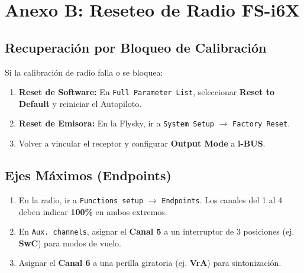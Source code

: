 \documentclass[12pt,a4paper]{article}
\begin{document}
\vspace{1cm}
\section{Anexo B: Reseteo de Radio FS-i6X}
\subsection{Recuperación por Bloqueo de Calibración}
Si la calibración de radio falla o se bloquea:
\begin{enumerate}[leftmargin=*,noitemsep]
    \item \textbf{Reset de Software:} En \texttt{Full Parameter List}, seleccionar \textbf{Reset to Default} y reiniciar el Autopiloto.
    \item \textbf{Reset de Emisora:} En la Flysky, ir a \texttt{System Setup} $\rightarrow$ \texttt{Factory Reset}.
    \item Volver a vincular el receptor y configurar \textbf{Output Mode} a \textbf{i-BUS}.
\end{enumerate}

\subsection{Ejes Máximos (Endpoints)}
\begin{enumerate}[leftmargin=*,noitemsep]
    \item En la radio, ir a \texttt{Functions setup} $\rightarrow$ \texttt{Endpoints}. Los canales del 1 al 4 deben indicar \textbf{100\%} en ambos extremos.
    \item En \texttt{Aux. channels}, asignar el \textbf{Canal 5} a un interruptor de 3 posiciones (ej. \textbf{SwC}) para modos de vuelo.
    \item Asignar el \textbf{Canal 6} a una perilla giratoria (ej. \textbf{VrA}) para sintonización.
\end{enumerate}

\newpage
\end{document}
